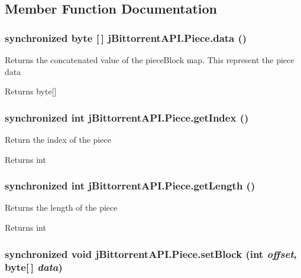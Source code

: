 \subsection{Member Function Documentation}
\hypertarget{classj_bittorrent_a_p_i_1_1_piece_af77baf7a92f73795d1e98b85e1ec512d}{
\subsubsection[{data}]{\setlength{\rightskip}{0pt plus 5cm}synchronized byte \mbox{[}$\,$\mbox{]} jBittorrentAPI.Piece.data ()}}
\label{classj_bittorrent_a_p_i_1_1_piece_af77baf7a92f73795d1e98b85e1ec512d}
Returns the concatenated value of the pieceBlock map. This represent the piece data \begin{DoxyReturn}{Returns}
byte\mbox{[}\mbox{]} 
\end{DoxyReturn}
\hypertarget{classj_bittorrent_a_p_i_1_1_piece_ab4afd0119225a5a9b0d11195b388ecf5}{
\subsubsection[{getIndex}]{\setlength{\rightskip}{0pt plus 5cm}synchronized int jBittorrentAPI.Piece.getIndex ()}}
\label{classj_bittorrent_a_p_i_1_1_piece_ab4afd0119225a5a9b0d11195b388ecf5}
Return the index of the piece \begin{DoxyReturn}{Returns}
int 
\end{DoxyReturn}
\hypertarget{classj_bittorrent_a_p_i_1_1_piece_a2f2bb859545d2369921e08d3b3b417bd}{
\subsubsection[{getLength}]{\setlength{\rightskip}{0pt plus 5cm}synchronized int jBittorrentAPI.Piece.getLength ()}}
\label{classj_bittorrent_a_p_i_1_1_piece_a2f2bb859545d2369921e08d3b3b417bd}
Returns the length of the piece \begin{DoxyReturn}{Returns}
int 
\end{DoxyReturn}
\hypertarget{classj_bittorrent_a_p_i_1_1_piece_a57e510992d23328b321f623af02c118b}{
\subsubsection[{setBlock}]{\setlength{\rightskip}{0pt plus 5cm}synchronized void jBittorrentAPI.Piece.setBlock (int {\em offset}, \/  byte\mbox{[}$\,$\mbox{]} {\em data})}}
